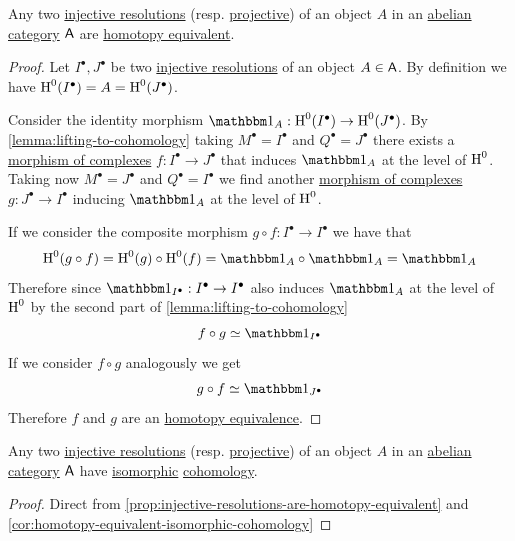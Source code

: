 \documentclass[../../../main]{subfiles}
\begin{document}
\begin{proposition}\label{prop:injective-resolutions-are-homotopy-equivalent}
  Any two \hyperref[def:injective-projective-resolution]{injective resolutions} (resp. \hyperref[def:injective-projective-resolution]{projective}) of an object \(A\) in an \hyperref[def:abelian-category]{abelian category} \(\mathsf{A}\) are \hyperref[def:homotopy-equivalence]{homotopy equivalent}.
\end{proposition}
\begin{proof}
  Let \(I^{\bullet}, J^{\bullet}\) be two \hyperref[def:injective-projective-resolution]{injective resolutions} of an object \(A \in \mathsf{A}\).
  By definition we have \(\operatorname{H}^{0}(I^{\bullet}) = A = \operatorname{H}^{0}(J^{\bullet})\).

  Consider the identity morphism \(\id_{A}: \cohomology{0}(I^{\bullet}) \to \cohomology{0}(J^{\bullet})\).
  By \autoref{lemma:lifting-to-cohomology} taking \(M^{\bullet} = I^{\bullet}\) and \(Q^{\bullet} = J^{\bullet}\) there exists a \hyperref[def:complex-morphism]{morphism of complexes} \(f: I^{\bullet} \to J^{\bullet}\) that induces \(\id_{A}\) at the level of \(\operatorname{H}^{0}\).
  Taking now \(M^{\bullet} = J^{\bullet}\) and \(Q^{\bullet} = I^{\bullet}\) we find another \hyperref[def:complex-morphism]{morphism of complexes} \(g: J^{\bullet} \to I^{\bullet}\) inducing \(\id_{A}\) at the level of \(\operatorname{H}^{0}\).

  If we consider the composite morphism \(g \circ f: I^{\bullet} \to I^{\bullet}\) we have that
  \begin{equation*}
    \cohomology{0}(g \circ f) = \cohomology{0}(g) \circ \cohomology{0}(f) = \id_{A} \circ \id_{A} = \id_{A}
  \end{equation*}
  Therefore since \(\id_{I^{\bullet}}: I^{\bullet} \to I^{\bullet}\) also induces \(\id_{A}\) at the level of \(\operatorname{H}^{0}\) by the second part of \autoref{lemma:lifting-to-cohomology}
  \begin{equation*}
    f \circ g \simeq \id_{I^{\bullet}}
  \end{equation*}
  If we consider \(f \circ g\) analogously we get
  \begin{equation*}
    g \circ f \simeq \id_{J^{\bullet}}
  \end{equation*}
  Therefore \(f\) and \(g\) are an \hyperref[def:homotopy-equivalence]{homotopy equivalence}.
\end{proof}


\begin{corollary} \label{cor:injective-have-same-cohomology}
  Any two \hyperref[def:injective-projective-resolution]{injective resolutions} (resp. \hyperref[def:injective-projective-resolution]{projective}) of an object \(A\) in an \hyperref[def:abelian-category]{abelian category} \(\mathsf{A}\) have \hyperref[def:categorical-isomorphism]{isomorphic} \hyperref[def:cohomology]{cohomology}.
\end{corollary}
\begin{proof}
  Direct from \autoref{prop:injective-resolutions-are-homotopy-equivalent} and \autoref{cor:homotopy-equivalent-isomorphic-cohomology}
\end{proof}
\end{document}
